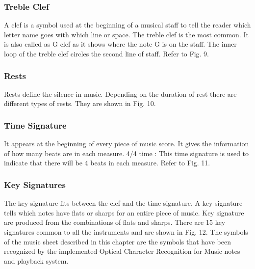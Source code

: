 \documentclass[journal]{IEEEtran}
\begin{document}
\subsubsection{Treble Clef}
A clef is a symbol used at the beginning of a musical staff to tell the reader which letter name
goes with which line or space. The treble clef is the most common. It is also called as G clef as it
shows where the note G is on the staff. The inner loop of the treble clef circles the second line of
staff. Refer to Fig. 9.

\subsubsection{Rests}
Rests define the silence in music. Depending on the duration of rest there are different types of
rests. They are shown in Fig. 10.

\subsubsection{Time Signature}
It appears at the beginning of every piece of music score. It gives the information of how many
beats are in each measure.
4/4 time :
This time signature is used to indicate that there will be 4 beats in each measure. Refer to Fig. 11.


\subsubsection{Key Signatures}
The key signature fits between the clef and the time signature. A key signature tells which notes
have flats or sharps for an entire piece of music. Key signature are produced from the combinations
of flats and sharps. There are 15 key signatures common to all the instruments and are shown in
Fig. 12. The symbols of the music sheet described in this chapter are the symbols that have been recognized by the implemented Optical Character Recognition for Music notes and playback system.




%
%
\end{document}
